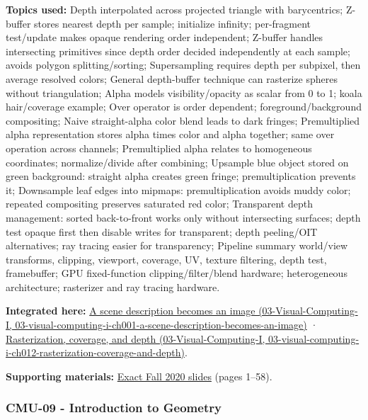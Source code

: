 \textbf{Topics used:} Depth interpolated across projected triangle with barycentrics; Z-buffer stores nearest depth per sample; initialize infinity; per-fragment test/update makes opaque rendering order independent; Z-buffer handles intersecting primitives since depth order decided independently at each sample; avoids polygon splitting/sorting; Supersampling requires depth per subpixel, then average resolved colors; General depth-buffer technique can rasterize spheres without triangulation; Alpha models visibility/opacity as scalar from 0 to 1; koala hair/coverage example; Over operator is order dependent; foreground/background compositing; Naive straight-alpha color blend leads to dark fringes; Premultiplied alpha representation stores alpha times color and alpha together; same over operation across channels; Premultiplied alpha relates to homogeneous coordinates; normalize/divide after combining; Upsample blue object stored on green background: straight alpha creates green fringe; premultiplication prevents it; Downsample leaf edges into mipmaps: premultiplication avoids muddy color; repeated compositing preserves saturated red color; Transparent depth management: sorted back-to-front works only without intersecting surfaces; depth test opaque first then disable writes for transparent; depth peeling/OIT alternatives; ray tracing easier for transparency; Pipeline summary world/view transforms, clipping, viewport, coverage, UV, texture filtering, depth test, framebuffer; GPU fixed-function clipping/filter/blend hardware; heterogeneous architecture; rasterizer and ray tracing hardware.

\textbf{Integrated here:} \href{../03-Visual-Computing-I/main.pdf\#nameddest=03-visual-computing-i-ch001-a-scene-description-becomes-an-image}{A scene description becomes an image (03-Visual-Computing-I, 03-visual-computing-i-ch001-a-scene-description-becomes-an-image)} · \href{../03-Visual-Computing-I/main.pdf\#nameddest=03-visual-computing-i-ch012-rasterization-coverage-and-depth}{Rasterization, coverage, and depth (03-Visual-Computing-I, 03-visual-computing-i-ch012-rasterization-coverage-and-depth)}.

\textbf{Supporting materials:} \href{https://15462.courses.cs.cmu.edu/fall2020content/lectures/08_depthtransparency/08_depthtransparency_slides.pdf}{Exact Fall 2020 slides} (pages 1--58).

\subsubsection{CMU-09 - Introduction to Geometry}\label{04-visual-computing-ii-ch036-cmu-09---introduction-to-geometry}

